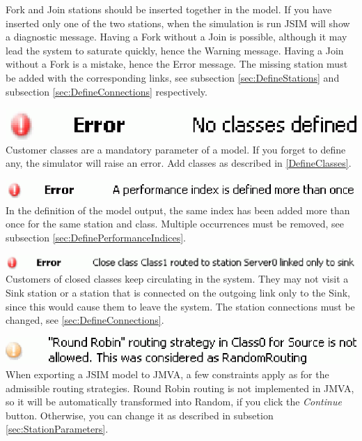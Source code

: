 \begin{itemize*}
Fork and Join stations should be inserted together in the model.
If you have inserted only one of the two stations, when the
simulation is run JSIM will show a diagnostic message. Having a
Fork without a Join is possible, although it may lead the system
to saturate quickly, hence the Warning message. Having a Join
without a Fork is a mistake, hence the Error message. The missing
station must be added with the corresponding links, see subsection
\autoref{sec:DefineStations} and subsection
\autoref{sec:DefineConnections} respectively.
\item \includegraphics[scale=.5]{img/jsim/6.eps}\\
Customer classes are a mandatory parameter of a model. If you forget to define any, the simulator will raise an error. Add classes as described in \autoref{DefineClasses}.
\item \includegraphics[scale=.5]{img/jsim/10.eps}\\
In the definition of the model output, the same index has been added more than once for the same station and class. Multiple occurrences must be removed, see subsection
\autoref{sec:DefinePerformanceIndices}.
\item \includegraphics[scale=.5]{img/jsim/11.eps}\\
Customers of closed classes keep circulating in the system. They may not visit a Sink station or a station that is connected on the outgoing link only to the Sink, since this would cause them to leave the system. The station connections must be changed, see \autoref{sec:DefineConnections}.
\item \includegraphics[scale=.5]{img/jsim/12.eps}\\
When exporting a JSIM model to JMVA, a few constraints apply as for the admissible routing strategies. Round Robin routing is not implemented in JMVA, so it will be automatically transformed into Random, if you click the \emph{Continue} button. Otherwise, you can change it as described in subsetion \autoref{sec:StationParameters}.

\end{itemize*}
